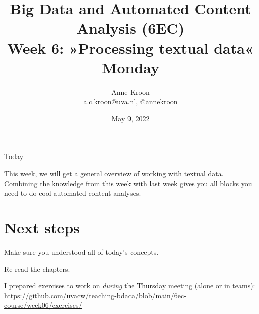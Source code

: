 

\graphicspath{{../../resources/img/}}




\title[Big Data and Automated Content Analysis]{\textbf{Big Data and Automated Content Analysis (6EC)} 
\\Week 6: »Processing textual data«
\\Monday}
\author[Anne Kroon]{Anne Kroon\\ \footnotesize{a.c.kroon@uva.nl, @annekroon \\}}
\date{May 9, 2022}


\begin{frame}{}
	\titlepage
\end{frame}

\begin{frame}{Today}
	\tableofcontents
\end{frame}




\begin{frame}[standout]
This week, we will get a general overview of working with textual data. Combining the knowledge from this week with last week gives you all blocks you need to do cool automated content analyses.
\end{frame}



















\section{Next steps}

\begin{frame}[standout]
Make sure you understood all of today's concepts.

Re-read the chapters.

I prepared exercises to work on \emph{during} the Thursday meeting (alone or in teams):
\large{\url{https://github.com/uvacw/teaching-bdaca/blob/main/6ec-course/week06/exercises/}}
\end{frame}





\begin{frame}
	\printbibliography
\end{frame}




